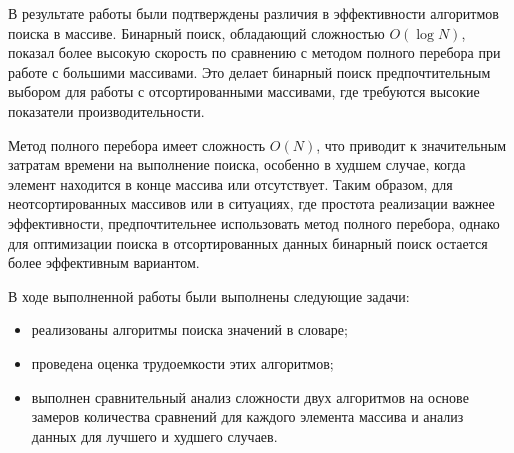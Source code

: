 
В результате работы были подтверждены различия в эффективности алгоритмов поиска в массиве. Бинарный поиск, обладающий сложностью $O(\log N)$, показал более высокую скорость по сравнению с методом полного перебора при работе с большими массивами. Это делает бинарный поиск предпочтительным выбором для работы с отсортированными массивами, где требуются высокие показатели производительности.

Метод полного перебора имеет сложность $O(N)$, что приводит к значительным затратам времени на выполнение поиска, особенно в худшем случае, когда элемент находится в конце массива или отсутствует. Таким образом, для неотсортированных массивов или в ситуациях, где простота реализации важнее эффективности, предпочтительнее использовать метод полного перебора, однако для оптимизации поиска в отсортированных данных бинарный поиск остается более эффективным вариантом.

В ходе выполненной работы были выполнены следующие задачи:
\begin{itemize}
    \item реализованы алгоритмы поиска значений в словаре;
    \item проведена оценка трудоемкости этих алгоритмов;
    \item выполнен сравнительный анализ сложности двух алгоритмов на основе замеров количества сравнений для каждого элемента массива и анализ данных для лучшего и худшего случаев.
\end{itemize}
